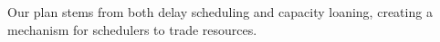 
Our plan stems from both delay scheduling and capacity loaning, creating a mechanism for schedulers 
to trade resources.
